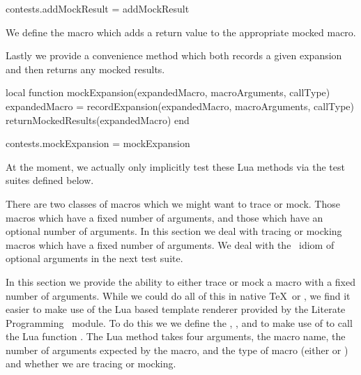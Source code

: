 contests.addMockResult = addMockResult
\stopLuaCode

We define the \type{\addMockResult} macro which adds a return 
value to the appropriate mocked macro. 

\startMkIVCode
\def\addMockResult#1#2{%
  \directlua{%
    thirddata.contests.addMockResult('#1', '#2')
  }
}
\stopMkIVCode

Lastly we provide a convenience method which both records a given 
expansion and then returns any mocked results. 

\startLuaCode
local function mockExpansion(expandedMacro,
                               macroArguments,
                               callType)
  expandedMacro = recordExpansion(expandedMacro,
                               macroArguments,
                               callType)
  returnMockedResults(expandedMacro)
end

contests.mockExpansion = mockExpansion
\stopLuaCode

At the moment, we actually only implicitly test these Lua methods via the 
test suites defined below. 

\stopTestSuite


There are two classes of macros which we might want to trace or mock. 
Those macros which have a fixed number of arguments, and those which have 
an optional number of arguments. In this section we deal with tracing or 
mocking macros which have a fixed number of arguments. We deal with the 
\ConTeXt\ idiom of optional arguments in the next test suite. 

In this section we provide the ability to either trace or mock a macro 
with a fixed number of arguments. While we could do all of this in native 
\TeX\ or \ConTeXt, we find it easier to make use of the Lua based template 
renderer provided by the Literate Programming \ConTeXt\ module. To do this 
we we define the \type{\traceTexMacro}, \type{\traceContextMacro}, 
\type{\mockTexMacro} and \type{\mockContextMacro} to make use of 
\type{\directlua} to call the Lua function . The Lua 
 method takes four arguments, the macro name, the 
number of arguments expected by the macro, and the type of macro (either 
 or ) and whether we are tracing or mocking. 

\startMkIVCode
\def\traceTexMacro#1#2{%
  \directlua{%
    thirddata.contests.createMacro('#1', #2, 'tex', 'trace')
  }
}


